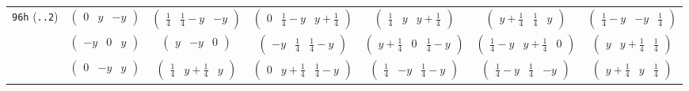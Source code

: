 \documentclass[fleqn,9pt,landscape]{jsarticle}
\begin{document}
\begin{center}
\begin{longtable}{ccccccc}
{\tt 96h} ({\tt ..2}) & $ \begin{pmatrix} 0 & y & - y \end{pmatrix} $ & $ \begin{pmatrix} \frac{1}{4} & \frac{1}{4} - y & - y \end{pmatrix} $ & $ \begin{pmatrix} 0 & \frac{1}{4} - y & y + \frac{1}{4} \end{pmatrix} $ & $ \begin{pmatrix} \frac{1}{4} & y & y + \frac{1}{4} \end{pmatrix} $ & $ \begin{pmatrix} y + \frac{1}{4} & \frac{1}{4} & y \end{pmatrix} $ & $ \begin{pmatrix} \frac{1}{4} - y & - y & \frac{1}{4} \end{pmatrix} $ \\
& $ \begin{pmatrix} - y & 0 & y \end{pmatrix} $ & $ \begin{pmatrix} y & - y & 0 \end{pmatrix} $ & $ \begin{pmatrix} - y & \frac{1}{4} & \frac{1}{4} - y \end{pmatrix} $ & $ \begin{pmatrix} y + \frac{1}{4} & 0 & \frac{1}{4} - y \end{pmatrix} $ & $ \begin{pmatrix} \frac{1}{4} - y & y + \frac{1}{4} & 0 \end{pmatrix} $ & $ \begin{pmatrix} y & y + \frac{1}{4} & \frac{1}{4} \end{pmatrix} $ \\
& $ \begin{pmatrix} 0 & - y & y \end{pmatrix} $ & $ \begin{pmatrix} \frac{1}{4} & y + \frac{1}{4} & y \end{pmatrix} $ & $ \begin{pmatrix} 0 & y + \frac{1}{4} & \frac{1}{4} - y \end{pmatrix} $ & $ \begin{pmatrix} \frac{1}{4} & - y & \frac{1}{4} - y \end{pmatrix} $ & $ \begin{pmatrix} \frac{1}{4} - y & \frac{1}{4} & - y \end{pmatrix} $ & $ \begin{pmatrix} y + \frac{1}{4} & y & \frac{1}{4} \end{pmatrix} $ \\

\end{longtable}
\end{center}
\end{document}
